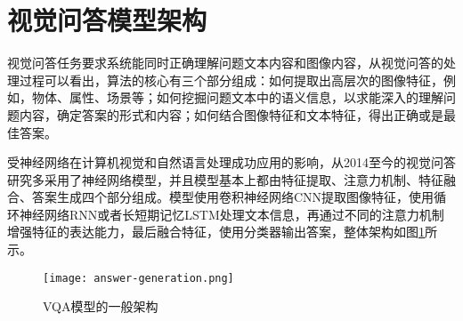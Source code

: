 
\section{视觉问答模型架构}
视觉问答任务要求系统能同时正确理解问题文本内容和图像内容，从视觉问答的处理过程可以看出，算法的核心有三个部分组成：如何提取出高层次的图像特征，例如，物体、属性、场景等；如何挖掘问题文本中的语义信息，以求能深入的理解问题内容，确定答案的形式和内容；如何结合图像特征和文本特征，得出正确或是最佳答案。

受神经网络在计算机视觉和自然语言处理成功应用的影响，从2014至今的视觉问答研究多采用了神经网络模型，并且模型基本上都由特征提取、注意力机制、特征融合、答案生成四个部分组成。模型使用卷积神经网络CNN提取图像特征，使用循环神经网络RNN或者长短期记忆LSTM处理文本信息，再通过不同的注意力机制增强特征的表达能力，最后融合特征，使用分类器输出答案，整体架构如图\ref{answer-generation}所示。
\begin{figure}[H]
	\centering
	\texttt{[image: answer-generation.png]}
	\caption{VQA模型的一般架构}
	\label{answer-generation}
\end{figure}




